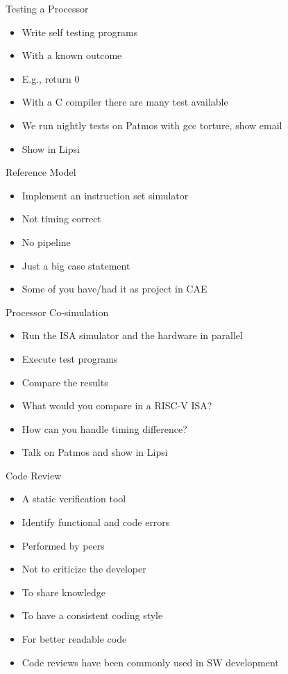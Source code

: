 \begin{frame}[fragile]{Testing a Processor}
\begin{itemize}
\item Write self testing programs
\item With a known outcome
\item E.g., return 0
\item With a C compiler there are many test available
\item We run nightly tests on Patmos with gcc torture, show email
\item Show in Lipsi
\end{itemize}
\end{frame}


\begin{frame}[fragile]{Reference Model}
\begin{itemize}
\item Implement an instruction set simulator
\item Not timing correct
\item No pipeline
\item Just a big case statement
\item Some of you have/had it as project in CAE
\end{itemize}
\end{frame}

\begin{frame}[fragile]{Processor Co-simulation}
\begin{itemize}
\item Run the ISA simulator and the hardware in parallel
\item Execute test programs
\item Compare the results
\item What would you compare in a RISC-V ISA?
\item How can you handle timing difference?
\item Talk on Patmos and show in Lipsi
\end{itemize}
\end{frame}

\begin{frame}[fragile]{Code Review}
\begin{itemize}
\item A static verification tool
\item Identify functional and code errors
\item Performed by peers
\item Not to criticize the developer
\item To share knowledge
\item To have a consistent coding style
\item For better readable code
\item Code reviews have been commonly used in SW development
\end{itemize}
\end{frame}


